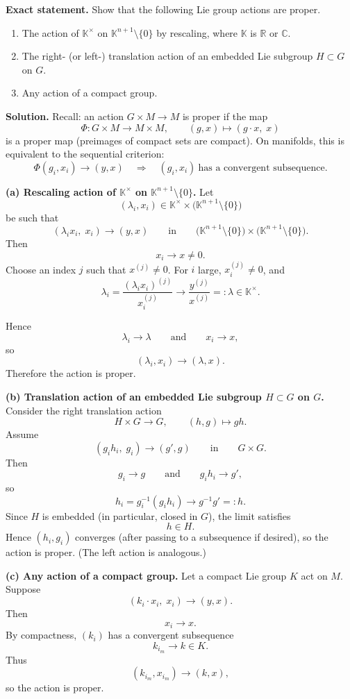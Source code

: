 \documentclass[12pt,a4paper]{article}
\theoremstyle{plain}
\theoremstyle{definition}      %
\begin{document}
\textbf{Exact statement.}
Show that the following Lie group actions are proper.
\begin{enumerate}
	\item The action of $\mathbb{K}^\times$ on $\mathbb{K}^{n+1}\setminus\{0\}$ by rescaling, where $\mathbb{K}$ is $\mathbb{R}$ or $\mathbb{C}$.
	\item The right- (or left-) translation action of an embedded Lie subgroup $H\subset G$ on $G$.
	\item Any action of a compact group.
\end{enumerate}

\textbf{Solution.}
Recall: an action $G\times M\to M$ is proper if the map
\[
\Phi: G\times M \longrightarrow M\times M,
\qquad
(g,x)\longmapsto (g\cdot x,\;x)
\]
is a proper map (preimages of compact sets are compact). On manifolds, this is equivalent to the sequential criterion:
\[
\Phi(g_i,x_i)\to (y,x)
\quad\Longrightarrow\quad
(g_i,x_i)\ \text{has a convergent subsequence.}
\]

\textbf{(a) Rescaling action of $\mathbb{K}^\times$ on $\mathbb{K}^{n+1}\setminus\{0\}$.}
Let
\[
(\lambda_i,x_i)\in \mathbb{K}^\times \times \bigl(\mathbb{K}^{n+1}\setminus\{0\}\bigr)
\]
be such that
\[
(\lambda_i x_i,\;x_i)\longrightarrow (y,x)
\qquad\text{in}\qquad
\bigl(\mathbb{K}^{n+1}\setminus\{0\}\bigr)\times\bigl(\mathbb{K}^{n+1}\setminus\{0\}\bigr).
\]
Then
\[
x_i\to x\neq 0.
\]
Choose an index $j$ such that $x^{(j)}\neq 0$. For $i$ large, $x_i^{(j)}\neq 0$, and
\[
\lambda_i
=
\frac{(\lambda_i x_i)^{(j)}}{x_i^{(j)}}
\longrightarrow
\frac{y^{(j)}}{x^{(j)}}
=:\lambda
\in \mathbb{K}^\times.
\]

Hence
\[
\lambda_i\to \lambda
\qquad\text{and}\qquad
x_i\to x,
\]
so
\[
(\lambda_i,x_i)\to (\lambda,x).
\]
Therefore the action is proper.

\textbf{(b) Translation action of an embedded Lie subgroup $H\subset G$ on $G$.}
Consider the right translation action
\[
H\times G\longrightarrow G,
\qquad
(h,g)\longmapsto g h.
\]
Assume
\[
(g_i h_i,\;g_i)\longrightarrow (g',g)
\qquad\text{in}\qquad
G\times G.
\]
Then
\[
g_i\to g
\qquad\text{and}\qquad
g_i h_i\to g',
\]
so
\[
h_i
=
g_i^{-1}(g_i h_i)
\longrightarrow
g^{-1}g'
=:h.
\]
Since $H$ is embedded (in particular, closed in $G$), the limit satisfies
\[
h\in H.
\]
Hence $(h_i,g_i)$ converges (after passing to a subsequence if desired), so the action is proper. (The left action is analogous.)

\textbf{(c) Any action of a compact group.}
Let a compact Lie group $K$ act on $M$. Suppose
\[
(k_i\cdot x_i,\;x_i)\longrightarrow (y,x).
\]
Then
\[
x_i\to x.
\]
By compactness, $(k_i)$ has a convergent subsequence
\[
k_{i_m}\to k\in K.
\]
Thus
\[
(k_{i_m},x_{i_m})\to (k,x),
\]
so the action is proper.
\end{document}
